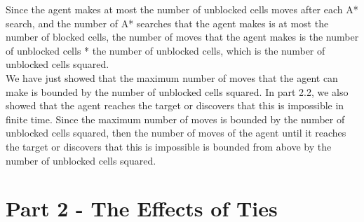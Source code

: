 \documentclass{article}
\begin{document}
Since the agent makes at most the number of unblocked cells moves after each A* search, and the number of A* searches that the agent makes is at most the number of blocked cells, the number of moves that the agent makes is the number of unblocked cells * the number of unblocked cells, which is the number of unblocked cells squared.\\

We have just showed that the maximum number of moves that the agent can make is bounded by the number of unblocked cells squared. In part 2.2, we also showed that the agent reaches the target or discovers that this is impossible in finite time. Since the maximum number of moves is bounded by the number of unblocked cells squared, then the number of moves of the agent until it reaches the target or discovers that this is impossible is bounded from above by the number of unblocked cells squared.


\section{Part 2 - The Effects of Ties}
\end{document}
